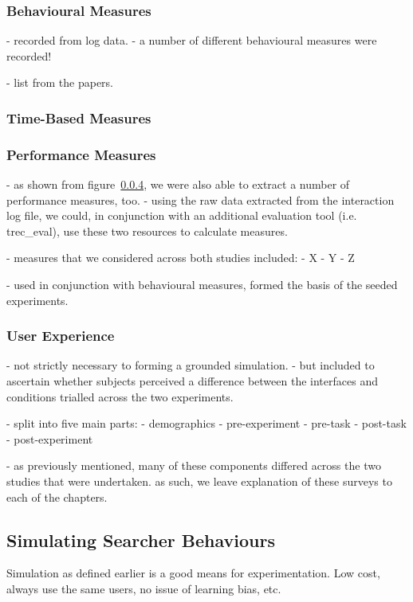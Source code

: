 \subsubsection{Behavioural Measures}
- recorded from log data.
- a number of different behavioural measures were recorded!

- list from the papers.

\subsubsection{Time-Based Measures}

\subsubsection{Performance Measures}
- as shown from figure~\ref{}, we were also able to extract a number of performance measures, too.
- using the raw data extracted from the interaction log file, we could, in conjunction with an additional evaluation tool (i.e. trec\_eval), use these two resources to calculate measures.

- measures that we considered across both studies included:
- X
- Y
- Z

- used in conjunction with behavioural measures, formed the basis of the seeded experiments.

\subsubsection{User Experience}
- not strictly necessary to forming a grounded simulation.
- but included to ascertain whether subjects perceived a difference between the interfaces and conditions trialled across the two experiments.

- split into five main parts:
    - demographics
    - pre-experiment
    - pre-task
    - post-task
    - post-experiment

- as previously mentioned, many of these components differed across the two studies that were undertaken. as such, we leave explanation of these surveys to each of the chapters.

\subsection{Simulating Searcher Behaviours}\label{chap:csm:method:simulation}
Simulation as defined earlier is a good means for experimentation.
Low cost, always use the same users, no issue of learning bias, etc.

